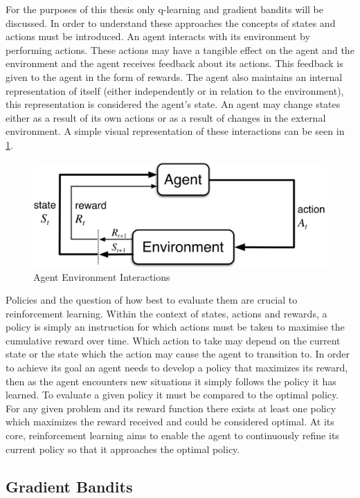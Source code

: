 For the purposes of this thesis only q-learning and gradient bandits will be discussed. In order to understand these approaches the concepts of states and actions must be introduced. An agent interacts with its environment by performing actions. These actions may have a tangible effect on the agent and the environment and the agent receives feedback about its actions. This feedback is given to the agent in the form of rewards. The agent also maintains an internal representation of itself (either independently or in relation to the environment), this representation is considered the agent’s state. An agent may change states either as a result of its own actions or as a result of changes in the external environment. A simple visual representation of these interactions can be seen in \ref{fig:agent}.

\begin{figure}[htp]
    \centering
        \includegraphics[width=.65\textwidth]{fig/agent.png}
        \caption{Agent Environment Interactions \cite{sutton_barto}}
        \label{fig:agent}
\end{figure}

Policies and the question of how best to evaluate them are crucial to reinforcement learning. Within the context of states, actions and rewards, a policy is simply an instruction for which actions must be taken to maximise the cumulative reward over time. Which action to take may depend on the current state or the state which the action may cause the agent to transition to. In order to achieve its goal an agent needs to develop a policy that maximizes its reward, then as the agent encounters new situations it simply follows the policy it has learned. To evaluate a given policy it must be compared to the optimal policy. For any given problem and its reward function there exists at least one policy which maximizes the reward received and could be considered optimal. At its core, reinforcement learning aims to enable the agent to continuously refine its current policy so that it approaches the optimal policy. 

\subsection{Gradient Bandits}
\label{subsection_gradient_bandits}

